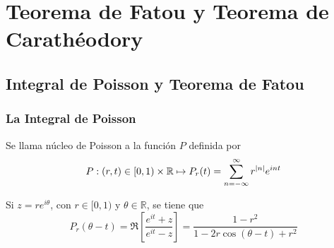 \chapter{Teorema de Fatou y Teorema de Carathéodory}

\begin{comment}
    \begin{theorem}[Lema de Schwart]
        Sea $f: \mathbb{D} \rightarrow \overline{\mathbb{D}}$ una función $\in \mathcal{H}(\mathbb{D})$ tal que $f(0) = 0$. Entonces:
        \begin{itemize}
            \item $\abs{f(z)} \leq \abs{z}$ para todo $z \in \mathbb{D}$.
            \item Si para algún $z_0 \not = 0$ tenemos que $\abs{f(z_0)} = \abs{z_0}$, entonces existe $\alpha \in \mathbb{C}, \abs{\alpha} = 1$ tal que $f(z)=\alpha z$.
        \end{itemize}
    \end{theorem}

    \begin{proof}
        Sea $f(z) = a_1z + \cdots$ la serie de potencias de $f$. El término constante es $0$ puesto que suponemos que $f(0) = 0$. Entonces $f(z)/z$ es una función holomorfa y
        \begin{equation*}
            \abs{\dfrac{f(z)}{z}} < 1/r \text{ para } \abs{z} = r < 1
        \end{equation*}
    \end{proof}
\end{comment}

\section{Integral de Poisson y Teorema de Fatou}

\subsection{La Integral de Poisson}

\begin{definition}
    Se llama núcleo de Poisson a la función $P$ definida por
    \begin{equation*}
        P:(r,t) \in [0,1)\times \mathbb{R} \mapsto P_r(t) = \sum_{n=-\infty}^{\infty} r^{\left\lvert n\right\rvert}e^{int}
    \end{equation*}

    Si $z=re^{i \theta}$, con $r \in [0,1)$ y $\theta \in \mathbb{R}$, se tiene que
    \begin{equation*}
        P_r(\theta - t) = \Re \left[ \dfrac{e^{it} + z}{e^{it} - z} \right] = \dfrac{1 - r^2}{1 - 2r \cos (\theta - t) + r^2}
    \end{equation*}
\end{definition}

